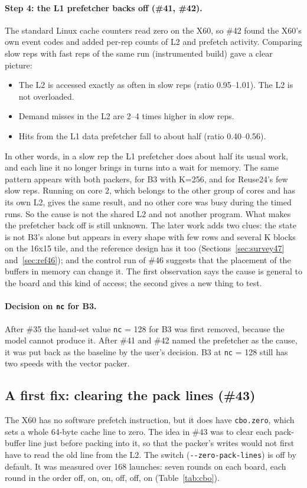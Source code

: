 \documentclass[11pt,a4paper]{article}
\begin{document}
\paragraph{Step 4: the L1 prefetcher backs off (\#41, \#42).} The standard Linux cache counters read zero on the
X60, so \#42 found the X60's own event codes and added per-rep counts of L2 and prefetch activity. Comparing slow
reps with fast reps of the same run (instrumented build) gave a clear picture:
\begin{itemize}
  \item The L2 is accessed exactly as often in slow reps (ratio 0.95--1.01). The L2 is not overloaded.
  \item Demand misses in the L2 are 2--4 times higher in slow reps.
  \item Hits from the L1 data prefetcher fall to about half (ratio 0.40--0.56).
\end{itemize}
In other words, in a slow rep the L1 prefetcher does about half its usual work, and each line it no longer
brings in turns into a wait for memory. The same pattern appears with both packers, for B3 with K=256, and for
Reuse24's few slow reps. Running on core 2, which belongs to the other group of cores and has its own L2, gives
the same result, and no other core was busy during the timed runs. So the cause is not the shared L2 and not
another program. What makes the prefetcher back off is still unknown. The later work adds two clues: the state is
not B3's alone but appears in every shape with few rows and several K blocks on the 16x15 tile, and the reference design has it
too (Sections~\ref{sec:survey47} and~\ref{sec:ref46}); and the control run of \#46 suggests that the placement of the buffers in
memory can change it. The first observation says the cause is general to the board and this kind of access; the second gives a
new thing to test.

\paragraph{Decision on \texttt{nc} for B3.} After \#35 the hand-set value \texttt{nc} = 128 for B3 was first
removed, because the model cannot produce it. After \#41 and \#42 named the prefetcher as the cause, it was put
back as the baseline by the user's decision. B3 at \texttt{nc} = 128 still has two speeds with the vector packer.

\subsection{A first fix: clearing the pack lines (\#43)}
The X60 has no software prefetch instruction, but it does have \texttt{cbo.zero}, which sets a whole 64-byte
cache line to zero. The idea in \#43 was to clear each pack-buffer line just before packing into it, so that the
packer's writes would not first have to read the old line from the L2. The switch
(\texttt{-{}-zero-pack-lines}) is off by default. It was measured over 168 launches: seven rounds on each board,
each round in the order off, on, on, off, off, on (Table~\ref{tab:cbo}).
\end{document}
